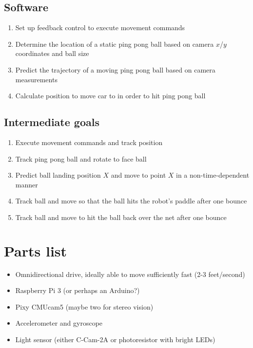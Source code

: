 \documentclass[letterpaper, 11pt]{article}
\begin{document}
\subsection*{Software}
\begin{enumerate}[label=\textbf{(\arabic*)}]
    \item Set up feedback control to execute movement commands
    \item Determine the location of a static ping pong ball based on camera $x$/$y$ coordinates and ball size
    \item Predict the trajectory of a moving ping pong ball based on camera measurements
    \item Calculate position to move car to in order to hit ping pong ball
\end{enumerate}

\subsection*{Intermediate goals}
\begin{enumerate}[label=\textbf{(\arabic*)}]
    \item Execute movement commands and track position
    \item Track ping pong ball and rotate to face ball
    \item Predict ball landing position $X$ and move to point $X$ in a non-time-dependent manner
    \item Track ball and move so that the ball hits the robot's paddle after one bounce
    \item Track ball and move to hit the ball back over the net after one bounce
\end{enumerate}

\section{Parts list}
\begin{itemize}
    \item Omnidirectional drive, ideally able to move sufficiently fast (2-3 feet/second)
    \item Raspberry Pi 3 (or perhaps an Arduino?)
    \item Pixy CMUcam5 (maybe two for stereo vision)
    \item Accelerometer and gyroscope
    \item Light sensor (either C-Cam-2A or photoresistor with bright LEDs)
\end{itemize}
\end{document}
